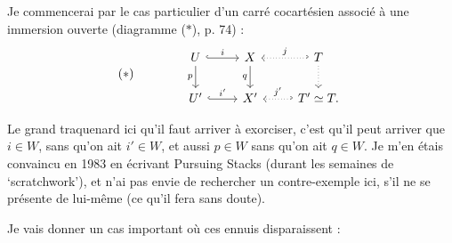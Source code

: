 Je commencerai par le cas particulier d’un carré cocartésien associé à une immersion ouverte (diagramme ($*$), p. 74) :
\[
(*)\qquad\qquad
\begin{tikzcd}
U \arrow[r, hook, "i"] \arrow[d, "p"'] & X \arrow[d, "q"'] & T \arrow[l, hook', dotted, "j"'] \arrow[d, dotted] \\
U' \arrow[r, hook, "i'"] & X' & T'\simeq T. \arrow[l, hook', dotted, "j'"']
\end{tikzcd}
\]

Le grand traquenard ici qu’il faut arriver à exorciser, c’est qu’il peut arriver que $i\in W$, sans qu’on ait $i'\in W$, et aussi $p\in W$ sans qu’on ait $q\in W$. Je m’en étais convaincu en 1983 en écrivant Pursuing Stacks (durant les semaines de ‘scratchwork’), et n’ai pas envie de rechercher un contre-exemple ici, s’il ne se présente de lui-même (ce qu’il fera sans doute).

Je vais donner un cas important où ces ennuis disparaissent :


